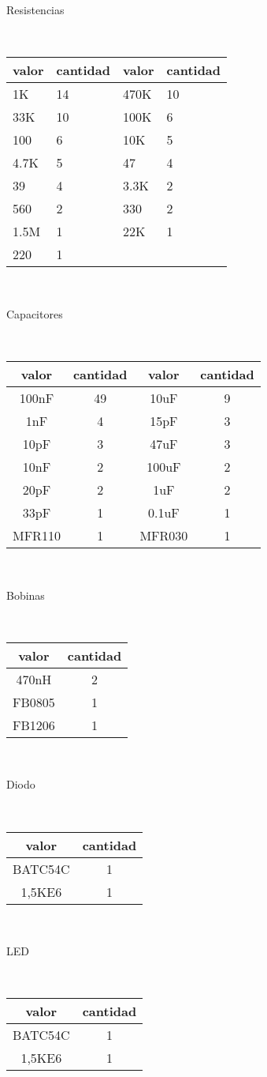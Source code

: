 \label{ch:componentes} 

Resistencias

\ 

\begin{tabular}{|l|l|l|l|}
\hline 
valor & cantidad & valor & cantidad\tabularnewline
\hline
\hline 
1K & 14 & 470K & 10\tabularnewline
\hline 
33K & 10 & 100K & 6\tabularnewline
\hline 
100 & 6 & 10K & 5\tabularnewline
\hline 
4.7K & 5 & 47 & 4\tabularnewline
\hline 
39 & 4 & 3.3K & 2\tabularnewline
\hline 
560 & 2 & 330 & 2\tabularnewline
\hline 
1.5M & 1 & 22K & 1\tabularnewline
\hline 
220 & 1 &  & \tabularnewline
\hline
\end{tabular}

\ 

Capacitores

\ 

\begin{tabular}{|c|c|c|c|}
\hline 
valor & cantidad & valor & cantidad\tabularnewline
\hline
\hline 
100nF & 49 & 10uF & 9\tabularnewline
\hline 
1nF & 4 & 15pF & 3\tabularnewline
\hline 
10pF & 3 & 47uF & 3\tabularnewline
\hline 
10nF & 2 & 100uF & 2\tabularnewline
\hline 
20pF & 2 & 1uF & 2\tabularnewline
\hline 
33pF & 1 & 0.1uF & 1\tabularnewline
\hline 
MFR110 & 1 & MFR030 & 1\tabularnewline
\hline
\end{tabular}

\ 

Bobinas

\ 

\begin{tabular}{|c|c|}
\hline 
valor & cantidad\tabularnewline
\hline
\hline 
470nH & 2\tabularnewline
\hline 
FB0805 & 1\tabularnewline
\hline 
FB1206 & 1\tabularnewline
\hline
\end{tabular}

\ 

Diodo

\ 

\begin{tabular}{|c|c|}
\hline 
valor & cantidad\tabularnewline
\hline
\hline 
BATC54C & 1\tabularnewline
\hline 
1,5KE6 & 1\tabularnewline
\hline
\end{tabular}

\ 

LED

\ 

\begin{tabular}{|c|c|}
\hline 
valor & cantidad\tabularnewline
\hline
\hline 
BATC54C & 1\tabularnewline
\hline 
1,5KE6 & 1\tabularnewline
\hline
\end{tabular}

